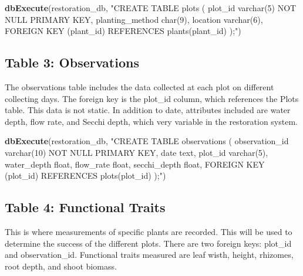 \documentclass[
]{book}
\newenvironment{Shaded}{\begin{snugshade}}{\end{snugshade}}
\newcommand{\KeywordTok}[1]{\textcolor[rgb]{0.13,0.29,0.53}{\textbf{#1}}}
\newcommand{\NormalTok}[1]{#1}
\newcommand{\StringTok}[1]{\textcolor[rgb]{0.31,0.60,0.02}{#1}}
\begin{document}
\begin{Shaded}
\begin{Highlighting}[]
\KeywordTok{dbExecute}\NormalTok{(restoration_db, }\StringTok{"CREATE TABLE plots (}
\StringTok{          plot_id varchar(5) NOT NULL PRIMARY KEY,}
\StringTok{          planting_method char(9),}
\StringTok{          location varchar(6), }
\StringTok{          FOREIGN KEY (plant_id) REFERENCES plants(plant_id)}
\StringTok{          );"}\NormalTok{)}
\end{Highlighting}
\end{Shaded}

\hypertarget{table-3-observations}{%
\subsection{Table 3: Observations}\label{table-3-observations}}

The observations table includes the data collected at each plot on different collecting days. The foreign key is the plot\_id column, which references the Plots table. This data is not static. In addition to date, attributes included are water depth, flow rate, and Secchi depth, which very variable in the restoration system.

\begin{Shaded}
\begin{Highlighting}[]
\KeywordTok{dbExecute}\NormalTok{(restoration_db, }\StringTok{"CREATE TABLE observations (}
\StringTok{          observation_id varchar(10) NOT NULL PRIMARY KEY,}
\StringTok{          date text,}
\StringTok{          plot_id varchar(5), }
\StringTok{          water_depth float, }
\StringTok{          flow_rate float,}
\StringTok{          secchi_depth float,}
\StringTok{          FOREIGN KEY (plot_id) REFERENCES plots(plot_id)}
\StringTok{          );"}\NormalTok{)}
\end{Highlighting}
\end{Shaded}

\hypertarget{table-4-functional-traits}{%
\subsection{Table 4: Functional Traits}\label{table-4-functional-traits}}

This is where measurements of specific plants are recorded. This will be used to determine the success of the different plots. There are two foreign keys: plot\_id and observation\_id. Functional traits measured are leaf wisth, height, rhizomes, root depth, and shoot biomass.
\end{document}
